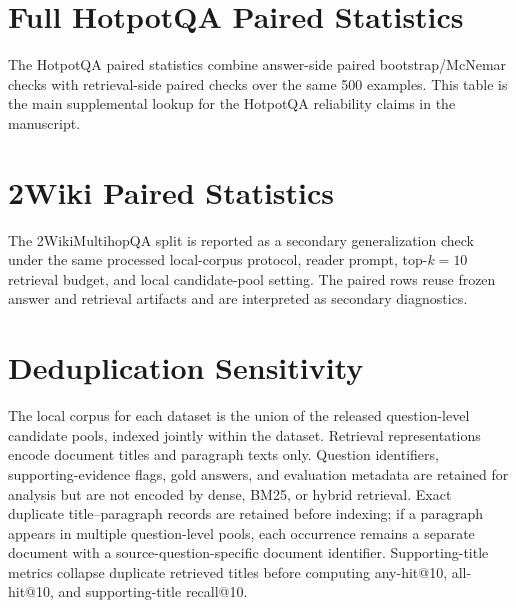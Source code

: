 \documentclass[10pt]{article}
\begin{document}



\clearpage
\section{Full HotpotQA Paired Statistics}
\label{sec:supp_hotpotqa_paired_statistics}

The HotpotQA paired statistics combine answer-side paired bootstrap/McNemar checks with retrieval-side paired checks over the same 500 examples. This table is the main supplemental lookup for the HotpotQA reliability claims in the manuscript.



\clearpage
\section{2Wiki Paired Statistics}
\label{sec:supp_2wiki_paired_statistics}

The 2WikiMultihopQA split is reported as a secondary generalization check under the same processed local-corpus protocol, reader prompt, top-$k=10$ retrieval budget, and local candidate-pool setting. The paired rows reuse frozen answer and retrieval artifacts and are interpreted as secondary diagnostics.



\clearpage
\section{Deduplication Sensitivity}
\label{sec:supp_deduplication_sensitivity}

The local corpus for each dataset is the union of the released question-level candidate pools, indexed jointly within the dataset. Retrieval representations encode document titles and paragraph texts only. Question identifiers, supporting-evidence flags, gold answers, and evaluation metadata are retained for analysis but are not encoded by dense, BM25, or hybrid retrieval. Exact duplicate title--paragraph records are retained before indexing; if a paragraph appears in multiple question-level pools, each occurrence remains a separate document with a source-question-specific document identifier. Supporting-title metrics collapse duplicate retrieved titles before computing any-hit@10, all-hit@10, and supporting-title recall@10.


\end{document}

